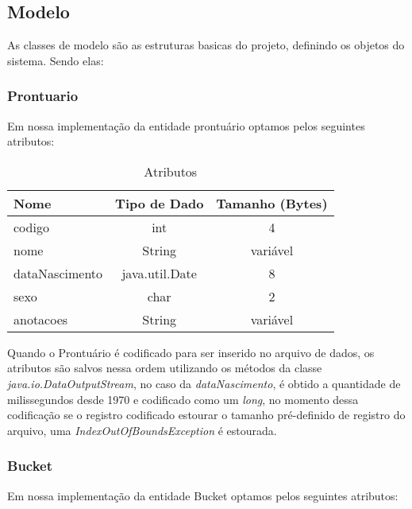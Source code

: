 \subsection{\esp Modelo}

As classes de modelo são as estruturas basicas do projeto, definindo os objetos do sistema. Sendo elas:


\subsubsection{\esp Prontuario}

Em nossa implementação da entidade prontuário optamos pelos seguintes atributos: 

\begin{table}[htb]
	\centering
	\caption{\hspace{0.1cm} Atributos }
	\vspace{-0.3cm} %
	\label{tab:tabela1}
	\begin{tabular}{l|c|c}
  \hline
    \textbf{Nome}	& \textbf{Tipo de Dado} & \textbf{Tamanho (Bytes)} \\
    \hline
     codigo         & int           & 4 \\
     nome   	    & String        & variável \\
     dataNascimento	& java.util.Date & 8 \\
     sexo           & char          & 2 \\
     anotacoes	    & String        & variável \\
     \hline
 \end{tabular}
\end{table}

Quando o Prontuário é codificado para ser inserido no arquivo de dados, os atributos são salvos nessa ordem utilizando os métodos da classe \textit{java.io.DataOutputStream}, no caso da \textit{dataNascimento}, é obtido a quantidade de milissegundos desde 1970 e codificado como um \textit{long}, no momento dessa codificação se o registro codificado estourar o tamanho pré-definido de registro do arquivo, uma \textit{IndexOutOfBoundsException} é estourada. 

\subsubsection{\esp Bucket}

Em nossa implementação da entidade Bucket optamos pelos seguintes atributos: 

